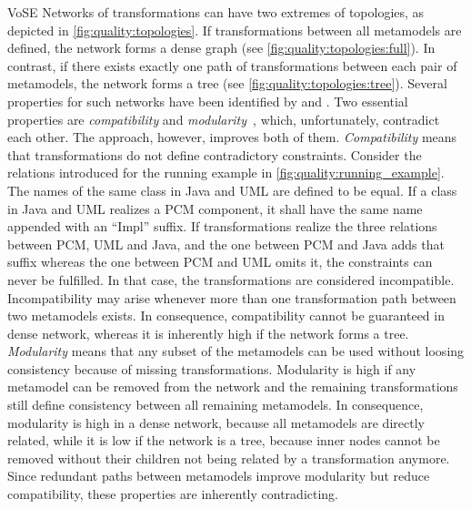 \begin{copiedFrom}{VoSE}
Networks of transformations can have two extremes of topologies, as depicted in \autoref{fig:quality:topologies}.
If transformations between all metamodels are defined, the network forms a dense graph (see \autoref{fig:quality:topologies:full}).
In contrast, if there exists exactly one path of transformations between each pair of metamodels, the network forms a tree (see \autoref{fig:quality:topologies:tree}).
Several properties for such %
networks have been identified by \textcite{gleitze2017a} and \textcite{klare2018docsym}.
Two essential properties %
are \emph{compatibility} and \emph{modularity}~\cite{klare2018docsym}, which, unfortunately, contradict each other.
The \commonalities approach, however, improves both of them. %
\emph{Compatibility} means that transformations do not define contradictory constraints.
Consider the relations introduced for the running example in \autoref{fig:quality:running_example}.
The names of the same class in Java and UML are defined to be equal.
If a class in Java and UML realizes a \ac{PCM} component, it shall have the same name appended with an \enquote{Impl} suffix.
If transformations realize the three relations between \ac{PCM}, UML and Java, and the one between \ac{PCM} and Java adds that suffix whereas the one between \ac{PCM} and UML omits it, the constraints can never be fulfilled.
In that case, the transformations are considered incompatible.
Incompatibility may arise whenever more than one transformation path between two metamodels exists.
In consequence, compatibility cannot be guaranteed in dense network, whereas it is inherently high if the network forms a tree.
\emph{Modularity} means that any subset of the metamodels can be used without loosing consistency because of missing transformations.
Modularity is high if any metamodel can be removed from the network and the remaining transformations still define consistency between all remaining metamodels.
In consequence, modularity is high in a dense network, because all metamodels are directly related, while it is low if the network is a tree, because inner nodes cannot be removed without their children not being related by a transformation anymore.
Since redundant paths between metamodels improve modularity but reduce compatibility, these properties are inherently contradicting.


\end{copiedFrom}
